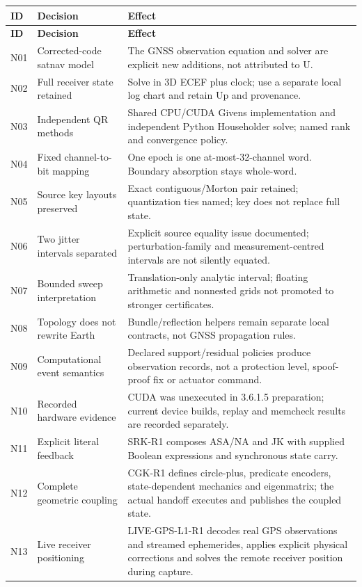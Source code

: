 \begin{longtable}{@{}P{.075\textwidth}P{.28\textwidth}P{.575\textwidth}@{}}\toprule
\textbf{ID} & \textbf{Decision} & \textbf{Effect}\\\midrule
\endfirsthead
\toprule\textbf{ID} & \textbf{Decision} & \textbf{Effect}\\\midrule\endhead
N01 & Corrected-code satnav model & The GNSS observation equation and solver are explicit new additions, not attributed to U.\\
N02 & Full receiver state retained & Solve in 3D ECEF plus clock; use a separate local log chart and retain Up and provenance.\\
N03 & Independent QR methods & Shared CPU/CUDA Givens implementation and independent Python Householder solve; named rank and convergence policy.\\
N04 & Fixed channel-to-bit mapping & One epoch is one at-most-32-channel word. Boundary absorption stays whole-word.\\
N05 & Source key layouts preserved & Exact contiguous/Morton pair retained; quantization ties named; key does not replace full state.\\
N06 & Two jitter intervals separated & Explicit source equality issue documented; perturbation-family and measurement-centred intervals are not silently equated.\\
N07 & Bounded sweep interpretation & Translation-only analytic interval; floating arithmetic and nonnested grids not promoted to stronger certificates.\\
N08 & Topology does not rewrite Earth & Bundle/reflection helpers remain separate local contracts, not GNSS propagation rules.\\
N09 & Computational event semantics & Declared support/residual policies produce observation records, not a protection level, spoof-proof fix or actuator command.\\
N10 & Recorded hardware evidence & CUDA was unexecuted in 3.6.1.5 preparation; current device builds, replay and memcheck results are recorded separately.\\
N11 & Explicit literal feedback & SRK-R1 composes ASA/NA and JK with supplied Boolean expressions and synchronous state carry.\\
N12 & Complete geometric coupling & CGK-R1 defines circle-plus, predicate encoders, state-dependent mechanics and eigenmatrix; the actual handoff executes and publishes the coupled state.\\
N13 & Live receiver positioning & LIVE-GPS-L1-R1 decodes real GPS observations and streamed ephemerides, applies explicit physical corrections and solves the remote receiver position during capture.\\\bottomrule
\end{longtable}
\normalsize

